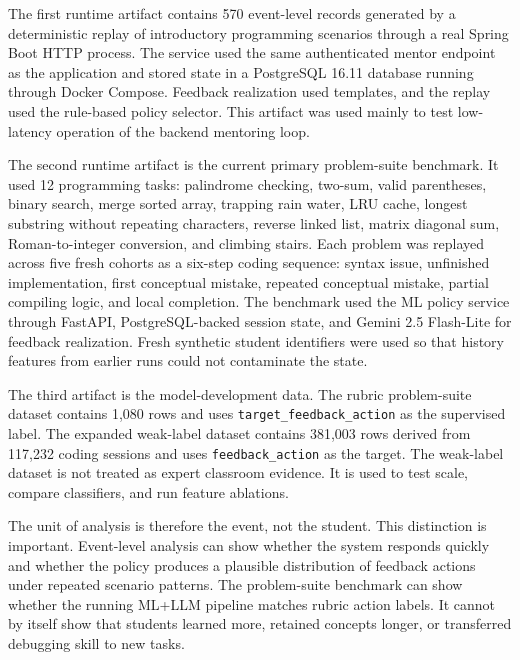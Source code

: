 \documentclass[11pt]{article}
\begin{document}
The first runtime artifact contains 570 event-level records generated by a deterministic replay of introductory programming scenarios through a real Spring Boot HTTP process. The service used the same authenticated mentor endpoint as the application and stored state in a PostgreSQL 16.11 database running through Docker Compose. Feedback realization used templates, and the replay used the rule-based policy selector. This artifact was used mainly to test low-latency operation of the backend mentoring loop.

The second runtime artifact is the current primary problem-suite benchmark. It used 12 programming tasks: palindrome checking, two-sum, valid parentheses, binary search, merge sorted array, trapping rain water, LRU cache, longest substring without repeating characters, reverse linked list, matrix diagonal sum, Roman-to-integer conversion, and climbing stairs. Each problem was replayed across five fresh cohorts as a six-step coding sequence: syntax issue, unfinished implementation, first conceptual mistake, repeated conceptual mistake, partial compiling logic, and local completion. The benchmark used the ML policy service through FastAPI, PostgreSQL-backed session state, and Gemini 2.5 Flash-Lite for feedback realization. Fresh synthetic student identifiers were used so that history features from earlier runs could not contaminate the state.

The third artifact is the model-development data. The rubric problem-suite dataset contains 1,080 rows and uses \texttt{target\_feedback\_action} as the supervised label. The expanded weak-label dataset contains 381,003 rows derived from 117,232 coding sessions and uses \texttt{feedback\_action} as the target. The weak-label dataset is not treated as expert classroom evidence. It is used to test scale, compare classifiers, and run feature ablations.

The unit of analysis is therefore the event, not the student. This distinction is important. Event-level analysis can show whether the system responds quickly and whether the policy produces a plausible distribution of feedback actions under repeated scenario patterns. The problem-suite benchmark can show whether the running ML+LLM pipeline matches rubric action labels. It cannot by itself show that students learned more, retained concepts longer, or transferred debugging skill to new tasks.
\end{document}
